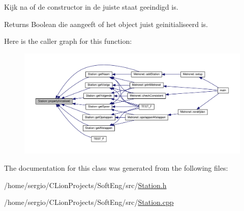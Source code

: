 Kijk na of de constructor in de juiste staat geeindigd is. 

\begin{DoxyReturn}{Returns}
Boolean die aangeeft of het object juist geinitialiseerd is. 
\end{DoxyReturn}
Here is the caller graph for this function\+:\nopagebreak
\begin{figure}[H]
\begin{center}
\leavevmode
\includegraphics[width=350pt]{class_station_a9ce626dd0599e3ea8107404a59c21e16_icgraph}
\end{center}
\end{figure}


The documentation for this class was generated from the following files\+:\begin{DoxyCompactItemize}
\item 
/home/sergio/\+C\+Lion\+Projects/\+Soft\+Eng/src/\hyperlink{_station_8h}{Station.\+h}\item 
/home/sergio/\+C\+Lion\+Projects/\+Soft\+Eng/src/\hyperlink{_station_8cpp}{Station.\+cpp}\end{DoxyCompactItemize}
